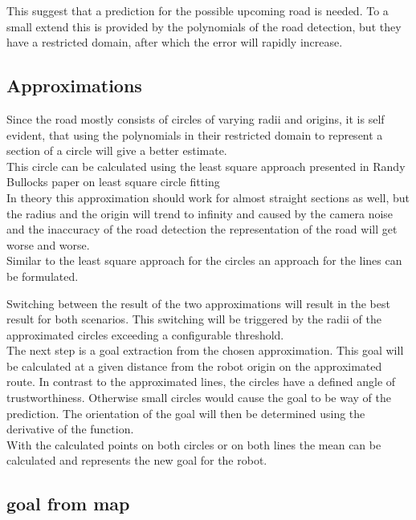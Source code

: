 This suggest that a prediction for the possible upcoming road is needed. To a small extend this is provided by the polynomials of the road detection, but they have a restricted domain, after which the error will rapidly increase.

\subsection{Approximations}

Since the road mostly consists of circles of varying radii and origins, it is self evident, that using the polynomials in their restricted domain to represent a section of a circle will give a better estimate.\\
This circle can be calculated using the least square approach presented in Randy Bullocks paper on least square circle fitting \cite{leastsquarecircle}\\

In theory this approximation should work for almost straight sections as well, but the radius and the origin will trend to infinity and caused by the camera noise and the inaccuracy of the road detection the representation of the road will get worse and worse.\\

Similar to the least square approach for the circles an approach for the lines can be formulated.

Switching between the result of the two approximations will result in the best result for both scenarios. This switching will be triggered by the radii of the approximated circles exceeding a configurable threshold.\\

The next step is a goal extraction from the chosen approximation. This goal will be calculated at a given distance from the robot origin on the approximated route. In contrast to the approximated lines, the circles have a defined angle of trustworthiness. Otherwise small circles would cause the goal to be way of the prediction. The orientation of the goal will then be determined using the derivative of the function.\\

With the calculated points on both circles or on both lines the mean can be calculated and represents the new goal for the robot.

\subsection{goal from map}

